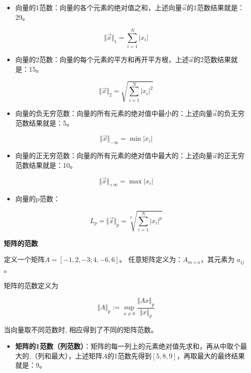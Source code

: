 \documentclass[]{book}
\providecommand{\tightlist}{%
  \setlength{\itemsep}{0pt}\setlength{\parskip}{0pt}}
\begin{document}
\begin{itemize}
\tightlist
\item
  向量的1范数：向量的各个元素的绝对值之和，上述向量\(\vec{a}\)的1范数结果就是：29。
\end{itemize}

\[
\Vert\vec{x}\Vert_1=\sum_{i=1}^N\vert{x_i}\vert
\]

\begin{itemize}
\tightlist
\item
  向量的2范数：向量的每个元素的平方和再开平方根，上述\(\vec{a}\)的2范数结果就是：15。
\end{itemize}

\[
\Vert\vec{x}\Vert_2=\sqrt{\sum_{i=1}^N{\vert{x_i}\vert}^2}
\]

\begin{itemize}
\tightlist
\item
  向量的负无穷范数：向量的所有元素的绝对值中最小的：上述向量\(\vec{a}\)的负无穷范数结果就是：5。
\end{itemize}

\[
\Vert\vec{x}\Vert_{-\infty}=\min{|{x_i}|}
\]

\begin{itemize}
\tightlist
\item
  向量的正无穷范数：向量的所有元素的绝对值中最大的：上述向量\(\vec{a}\)的正无穷范数结果就是：10。
\end{itemize}

\[
\Vert\vec{x}\Vert_{+\infty}=\max{|{x_i}|}
\]

\begin{itemize}
\tightlist
\item
  向量的p范数：
\end{itemize}

\[
L_p=\Vert\vec{x}\Vert_p=\sqrt[p]{\sum_{i=1}^{N}|{x_i}|^p}
\]

\textbf{矩阵的范数}

定义一个矩阵\(A=[-1, 2, -3; 4, -6, 6]\)。
任意矩阵定义为：\(A_{m\times n}\)，其元素为 \(a_{ij}\)。

矩阵的范数定义为

\[
\Vert{A}\Vert_p :=\sup_{x\neq 0}\frac{\Vert{Ax}\Vert_p}{\Vert{x}\Vert_p}
\]

当向量取不同范数时, 相应得到了不同的矩阵范数。

\begin{itemize}
\tightlist
\item
  \textbf{矩阵的1范数（列范数）}：矩阵的每一列上的元素绝对值先求和，再从中取个最大的,（列和最大），上述矩阵\(A\)的1范数先得到\([5,8,9]\)，再取最大的最终结果就是：9。
\end{itemize}
\end{document}
